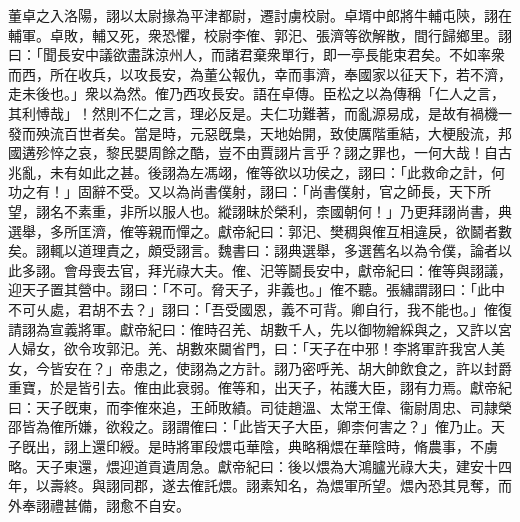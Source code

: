 \begin{pinyinscope}
董卓之入洛陽，詡以太尉掾為平津都尉，遷討虜校尉。卓壻中郎將牛輔屯陝，詡在輔軍。卓敗，輔又死，衆恐懼，校尉李傕、郭汜、張濟等欲解散，間行歸鄉里。詡曰：「聞長安中議欲盡誅涼州人，而諸君棄衆單行，即一亭長能束君矣。不如率衆而西，所在收兵，以攻長安，為董公報仇，幸而事濟，奉國家以征天下，若不濟，走未後也。」衆以為然。傕乃西攻長安。語在卓傳。臣松之以為傳稱「仁人之言，其利愽哉」！然則不仁之言，理必反是。夫仁功難著，而亂源易成，是故有禍機一發而殃流百世者矣。當是時，元惡旣梟，天地始開，致使厲階重結，大梗殷流，邦國遘殄悴之哀，黎民嬰周餘之酷，豈不由賈詡片言乎？詡之罪也，一何大哉！自古兆亂，未有如此之甚。後詡為左馮翊，傕等欲以功侯之，詡曰：「此救命之計，何功之有！」固辭不受。又以為尚書僕射，詡曰：「尚書僕射，官之師長，天下所望，詡名不素重，非所以服人也。縱詡昧於榮利，柰國朝何！」乃更拜詡尚書，典選舉，多所匡濟，傕等親而憚之。獻帝紀曰：郭汜、樊稠與傕互相違戾，欲鬬者數矣。詡輒以道理責之，頗受詡言。魏書曰：詡典選舉，多選舊名以為令僕，論者以此多詡。會母喪去官，拜光祿大夫。傕、汜等鬬長安中，獻帝紀曰：傕等與詡議，迎天子置其營中。詡曰：「不可。脅天子，非義也。」傕不聽。張繡謂詡曰：「此中不可乆處，君胡不去？」詡曰：「吾受國恩，義不可背。卿自行，我不能也。」傕復請詡為宣義將軍。獻帝紀曰：傕時召羌、胡數千人，先以御物繒綵與之，又許以宮人婦女，欲令攻郭汜。羌、胡數來闚省門，曰：「天子在中邪！李將軍許我宮人美女，今皆安在？」帝患之，使詡為之方計。詡乃密呼羌、胡大帥飲食之，許以封爵重寶，於是皆引去。傕由此衰弱。傕等和，出天子，祐護大臣，詡有力焉。獻帝紀曰：天子旣東，而李傕來追，王師敗績。司徒趙溫、太常王偉、衞尉周忠、司隷榮邵皆為傕所嫌，欲殺之。詡謂傕曰：「此皆天子大臣，卿柰何害之？」傕乃止。天子旣出，詡上還印綬。是時將軍段煨屯華陰，典略稱煨在華陰時，脩農事，不虜略。天子東還，煨迎道貢遺周急。獻帝紀曰：後以煨為大鴻臚光祿大夫，建安十四年，以壽終。與詡同郡，遂去傕託煨。詡素知名，為煨軍所望。煨內恐其見奪，而外奉詡禮甚備，詡愈不自安。


\end{pinyinscope}
